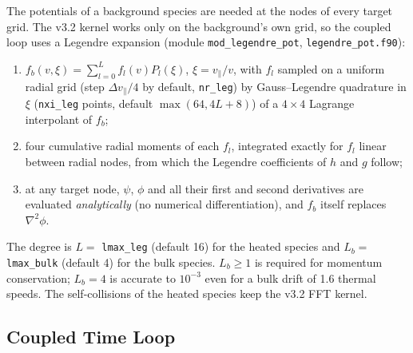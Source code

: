 \documentclass[11pt,a4paper]{article}
\newcommand{\vpa}{v_\parallel}
\begin{document}
The potentials of a background species are needed at the nodes of every target grid.  The v3.2
kernel works only on the background's own grid, so the coupled loop uses a Legendre expansion
(module \texttt{mod\_legendre\_pot}, \texttt{legendre\_pot.f90}):
\begin{enumerate}
\item $f_b(v,\xi)=\sum_{l=0}^Lf_l(v)P_l(\xi)$, $\xi=\vpa/v$, with $f_l$ sampled on a uniform radial grid
  (step $\Delta\vpa/4$ by default, \texttt{nr\_leg}) by Gauss--Legendre quadrature in $\xi$
  (\texttt{nxi\_leg} points, default $\max(64,4L+8)$) of a $4\times4$ Lagrange interpolant of $f_b$;
\item four cumulative radial moments of each $f_l$, integrated exactly for $f_l$ linear between radial
  nodes, from which the Legendre coefficients of $h$ and $g$ follow;
\item at any target node, $\psi$, $\phi$ and all their first and second derivatives are evaluated
  \emph{analytically} (no numerical differentiation), and $f_b$ itself replaces $\nabla^2\phi$.
\end{enumerate}
The degree is $L=$ \texttt{lmax\_leg} (default 16) for the heated species and $L_b=$
\texttt{lmax\_bulk} (default 4) for the bulk species.  $L_b\ge1$ is required for momentum
conservation; $L_b=4$ is accurate to $10^{-3}$ even for a bulk drift of 1.6 thermal speeds.  The
self-collisions of the heated species keep the v3.2 FFT kernel.

\subsection{Coupled Time Loop}
\label{sec:ms_loop}
\end{document}
